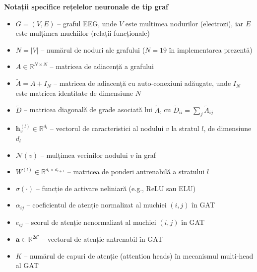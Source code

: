 \documentclass[12pt,a4paper]{report}
\theoremstyle{definition}
\theoremstyle{remark}
\begin{document}
\vspace{8pt}
\noindent\textbf{Notații specifice rețelelor neuronale de tip graf}
\begin{itemize}
    \item $G = (V, E)$ -- graful EEG, unde $V$ este mulțimea nodurilor (electrozi), iar $E$ este mulțimea muchiilor (relații funcționale)
    \item $N = |V|$ -- numărul de noduri ale grafului ($N = 19$ în implementarea prezentă)
    \item $A \in \mathbb{R}^{N \times N}$ -- matricea de adiacență a grafului
    \item $\tilde{A} = A + I_N$ -- matricea de adiacență cu auto-conexiuni adăugate, unde $I_N$ este matricea identitate de dimensiune $N$
    \item $\tilde{D}$ -- matricea diagonală de grade asociată lui $\tilde{A}$, cu $\tilde{D}_{ii} = \sum_j \tilde{A}_{ij}$
    \item $\mathbf{h}_v^{(l)} \in \mathbb{R}^{d_l}$ -- vectorul de caracteristici al nodului $v$ la stratul $l$, de dimensiune $d_l$
    \item $\mathcal{N}(v)$ -- mulțimea vecinilor nodului $v$ în graf
    \item $W^{(l)} \in \mathbb{R}^{d_l \times d_{l+1}}$ -- matricea de ponderi antrenabilă a stratului $l$
    \item $\sigma(\cdot)$ -- funcție de activare neliniară (e.g., ReLU sau ELU)
    \item $\alpha_{ij}$ -- coeficientul de atenție normalizat al muchiei $(i, j)$ în GAT
    \item $e_{ij}$ -- scorul de atenție nenormalizat al muchiei $(i, j)$ în GAT
    \item $\mathbf{a} \in \mathbb{R}^{2d'}$ -- vectorul de atenție antrenabil în GAT
    \item $K$ -- numărul de capuri de atenție (attention heads) în mecanismul multi-head al GAT
\end{itemize}
\end{document}
